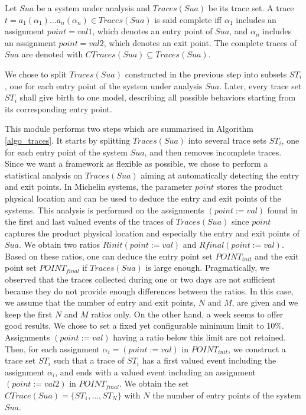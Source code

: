 \begin{definition}
Let $\mathit{Sua}$ be a system under analysis and $Traces({Sua})$
be its trace set. A trace $t=a_1(\alpha_1) \dots a_n(\alpha_n) \in
Traces({Sua})$ is said complete iff $\alpha_1$ includes an
assignment $point=val1$, which denotes an entry point of
$\mathit{Sua}$, and $\alpha_n$ includes an assignment
$point=val2$, which denotes an exit point.  The complete traces
of $\mathit{Sua}$ are denoted with $CTraces({Sua}) \subseteq
Traces({Sua})$.
\end{definition}

We chose to split $Traces(Sua)$ constructed in the previous step
into subsets $ST_i$, one for each entry point of the system under
analysis $\mathit{Sua}$. Later, every trace set $ST_i$ shall give birth to
one model, describing all possible behaviors starting from its
corresponding entry point.

This module performs two steps which are summarised in Algorithm
\ref{algo_traces}. It starts by splitting $Traces(Sua)$ into
several trace sets $ST_i$, one for each entry point of the system
$\mathit{Sua}$, and then removes incomplete traces. Since we want a
framework as flexible as possible, we chose to perform a
statistical analysis on $Traces(Sua)$ aiming at automatically
detecting the entry and exit points.
In Michelin systems, the parameter $point$ stores the product
physical location and can be used to deduce the entry and exit
points of the systems.
This analysis is performed on the assignments $(point:=val)$
found in the first and last valued events of the traces of
$Traces(Sua)$ since $point$ captures the product physical
location and especially the entry and exit points of $\mathit{Sua}$.
We obtain two ratios $Rinit(point:=val)$ and
$Rfinal(point:=val)$.  Based on these ratios, one can deduce the
entry point set $POINT_{init}$ and the exit point set
$POINT_{final}$ if $Traces(Sua)$ is large enough. Pragmatically,
we observed that the traces collected during one or two days are
not sufficient because they do not provide enough differences
between the ratios. In this case, we assume that the number of
entry and exit points, $N$ and $M$, are given and we keep the
first $N$ and $M$ ratios only. On the other hand, a week seems to
offer good results. We chose to set a fixed yet configurable
minimum limit to 10\%. Assignments $(point:=val)$ having a ratio
below this limit are not retained. Then, for each assignment
$\alpha_i=(point:=val)$ in $POINT_{init}$, we construct a trace
set $ST_i$ such that a trace of $ST_i$ has a first valued event
including the assignment $\alpha_i$, and ends with a valued event
including an assignment $(point:=val2)$ in $POINT_{final}$. We
obtain the set $CTrace(Sua)=\{ST_1,...,ST_N\}$ with $N$ the
number of entry points of the system $\mathit{Sua}$.

